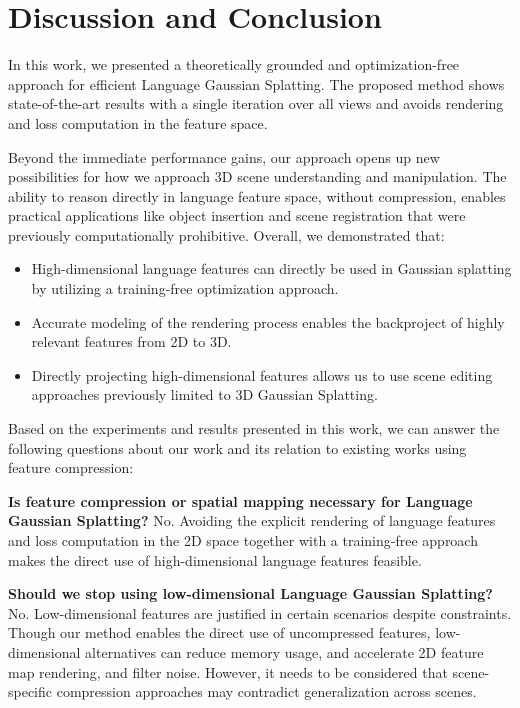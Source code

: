 \section{Discussion and Conclusion}
In this work, we presented a theoretically grounded and optimization-free approach for efficient Language Gaussian Splatting. The proposed method shows state-of-the-art results with a single iteration over all views and avoids rendering and loss computation in the feature space.

Beyond the immediate performance gains, our approach opens up new possibilities for how we approach 3D scene understanding and manipulation. The ability to reason directly in language feature space, without compression, enables practical applications like object insertion and scene registration that were previously computationally prohibitive. Overall, we demonstrated that:
\begin{itemize}
    \item High-dimensional language features can directly be used in Gaussian splatting by utilizing a training-free optimization approach.
    \item Accurate modeling of the rendering process enables the backproject of highly relevant features from 2D to 3D.
    \item Directly projecting high-dimensional features allows us to use scene editing approaches previously limited to 3D Gaussian Splatting.
\end{itemize}
Based on the experiments and results presented in this work, we can answer the following questions about our work and its relation to existing works using feature compression:

\noindent\textbf{Is feature compression or spatial mapping necessary for Language Gaussian Splatting?} No. Avoiding the explicit rendering of language features and loss computation in the 2D space together with a training-free approach makes the direct use of high-dimensional language features feasible. 

\noindent\textbf{Should we stop using low-dimensional Language Gaussian Splatting?} No. Low-dimensional features are justified in certain scenarios despite constraints. Though our method enables the direct use of uncompressed features, low-dimensional alternatives can reduce memory usage, and accelerate 2D feature map rendering, and filter noise. However, it needs to be considered that scene-specific compression approaches may contradict generalization across scenes.

